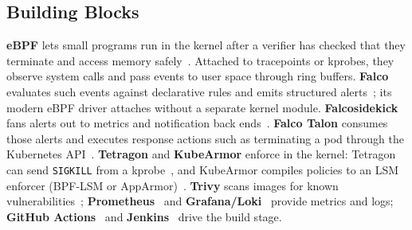 \documentclass[10pt,conference]{IEEEtran}
\begin{document}
\subsection{Building Blocks}
\textbf{eBPF} lets small programs run in the kernel after a verifier has checked that they terminate and access memory safely~\cite{ebpf}. Attached to tracepoints or kprobes, they observe system calls and pass events to user space through ring buffers. \textbf{Falco} evaluates such events against declarative rules and emits structured alerts~\cite{falco}; its modern eBPF driver attaches without a separate kernel module. \textbf{Falcosidekick} fans alerts out to metrics and notification back ends~\cite{falcosidekick}. \textbf{Falco Talon} consumes those alerts and executes response actions such as terminating a pod through the Kubernetes API~\cite{talon}. \textbf{Tetragon} and \textbf{KubeArmor} enforce in the kernel: Tetragon can send \texttt{SIGKILL} from a kprobe~\cite{tetragon}, and KubeArmor compiles policies to an LSM enforcer (BPF-LSM or AppArmor)~\cite{kubearmor}. \textbf{Trivy} scans images for known vulnerabilities~\cite{trivy}; \textbf{Prometheus}~\cite{prometheus} and \textbf{Grafana/Loki}~\cite{loki} provide metrics and logs; \textbf{GitHub Actions}~\cite{ghactions} and \textbf{Jenkins}~\cite{jenkins} drive the build stage.
\end{document}
